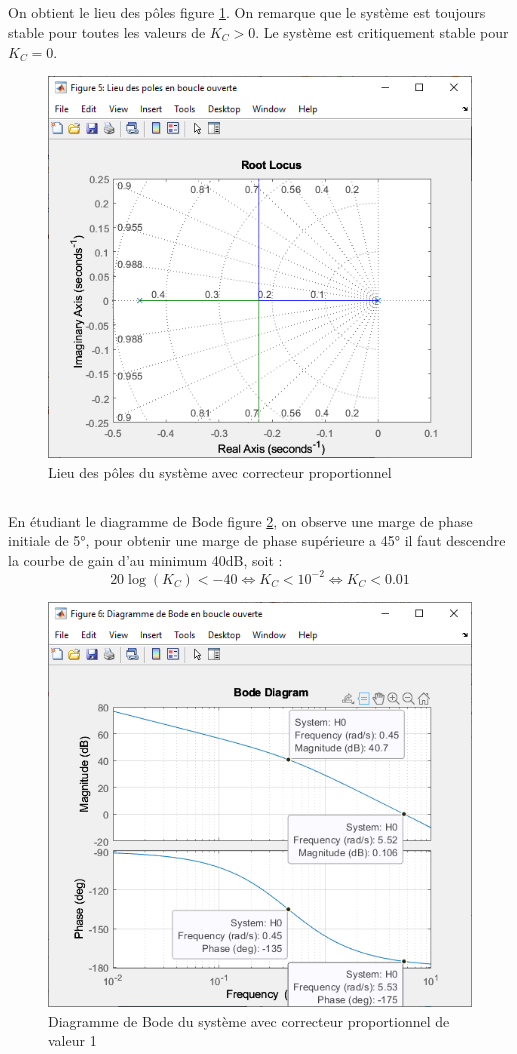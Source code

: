 \documentclass{article}
\begin{document}
\subsection{}
On obtient le lieu des pôles figure \ref{fig:rlocus123}. On remarque que le système est toujours stable pour toutes les valeurs de $K_C>0$. Le système est critiquement stable pour $K_C=0$.
\begin{figure}[h]
    \centering
    \includegraphics[width=0.5\linewidth]{rlocus123.PNG}
    \caption{Lieu des pôles du système avec correcteur proportionnel}
    \label{fig:rlocus123}
\end{figure}
\subsection{}
En étudiant le diagramme de Bode figure \ref{fig:bode124}, on observe une marge de phase initiale de 5°, pour obtenir une marge de phase supérieure a 45° il faut descendre la courbe de gain d'au minimum 40dB, soit :
$$
    20\log(K_C)<-40\Leftrightarrow K_C<10^{-2}\Leftrightarrow K_C<0.01
$$
\begin{figure}[h]
    \centering
    \includegraphics[width=0.5\linewidth]{bode124.PNG}
    \caption{Diagramme de Bode du système avec correcteur proportionnel de valeur 1}
    \label{fig:bode124}
\end{figure}
\end{document}
